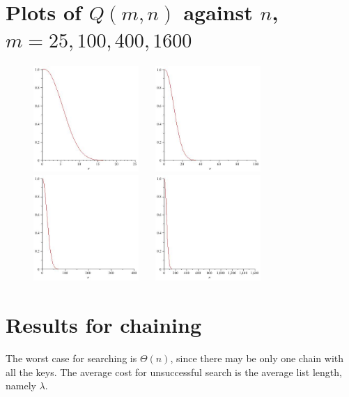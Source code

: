 \section*{Plots of $Q(m, n)$ against $n$, $m=25,100,400,1600$}
\begin{figure}
\centering
\includegraphics[width=4cm]{figs/birthday25.jpg}
$\quad$
\includegraphics[width=4cm]{figs/birthday100.jpg}\\
\includegraphics[width=4cm]{figs/birthday400.jpg}
$\quad$
\includegraphics[width=4cm]{figs/birthday1600.jpg}
\end{figure}

\section*{Results for chaining}

The worst case for searching is $\Theta(n)$, since there may be only one 
chain with all the keys. The average cost for unsuccessful search is the average list length, 
namely $\lambda$.

